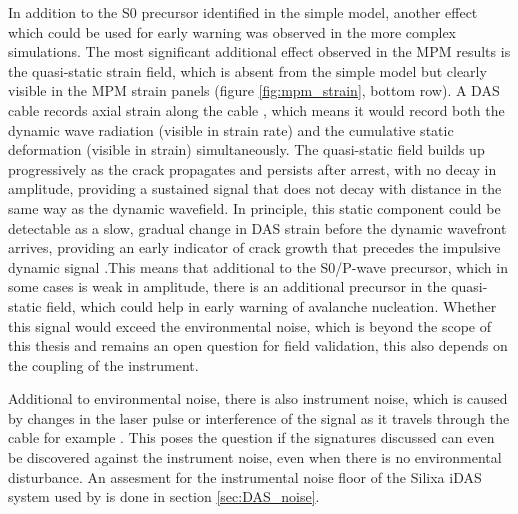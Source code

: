 In addition to the S0 precursor identified in the simple model, another effect which could be used for early warning was observed in the more complex simulations. The most significant additional effect observed in the MPM results is the quasi-static strain field, which is absent from the simple model but
clearly visible in the MPM strain panels (figure \ref{fig:mpm_strain},
bottom row). A DAS cable records axial strain along the cable
\parencite{hartogIntroductionDistributedOptical2017}, which means it
would record both the dynamic wave radiation (visible in strain rate)
and the cumulative static deformation (visible in strain) simultaneously.
The quasi-static field builds up progressively as the crack propagates
and persists after arrest, with no decay in amplitude, providing a sustained signal that does not decay with distance in the same way as the dynamic wavefield. In principle, this static component could be detectable as a slow, gradual change in DAS strain before the dynamic wavefront arrives, providing an early indicator of crack growth that precedes the impulsive dynamic signal \parencite{freundDynamicFractureMechanics1990,
heierliAnticrackNucleationTriggering2008}.This means that additional to the S0/P-wave precursor, which in some cases is weak in amplitude, there is an additional precursor in the quasi-static field, which could help in early warning of avalanche nucleation. Whether this signal would
exceed the environmental noise, which is beyond the scope of this
thesis and remains an open question for field validation, this also depends on the coupling of the instrument. \par 

Additional to environmental noise, there is also instrument noise, which is caused by changes in the laser pulse or interference of the signal as it travels through the cable for example \parencite{lindseyFiberOpticSeismology2021}. This poses the question if the signatures discussed can even be discovered against the instrument noise, even when there is no environmental disturbance. An assesment for the instrumental noise floor of the Silixa iDAS system used by \cite{paitzPhenomenologyAvalancheRecordings2023} is done in section \ref{sec:DAS_noise}. \par

